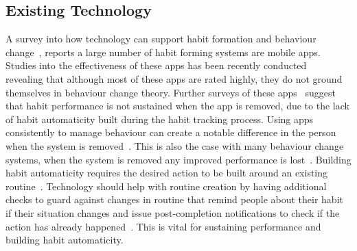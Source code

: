 
\subsection{Existing Technology}
A survey into how technology can support habit formation and behaviour change~\cite{survey_on_current_apps_of_steel}, reports a large number of habit forming systems are mobile apps. Studies into the effectiveness of these apps has been recently conducted~\cite{article_beyond_self_tracking_designing_apps, article_dont_kick_habit} revealing that although most of these apps are rated highly, they do not ground themselves in behaviour change theory. Further surveys of these apps~\cite{survey_on_apps_2} suggest that habit performance is not sustained when the app is removed, due to the lack of habit automaticity built during the habit tracking process. Using apps consistently to manage behaviour can create a notable difference in the person when the system is removed~\cite{article_my_phone_is_part_of_my_soul}.
This is also the case with many behaviour change systems, when the system is removed any improved performance is lost~\cite{article_dont_kick_habit, article_realtime_feedback_improving_medication_taking}. Building habit automaticity requires the desired action to be built around an existing routine~\cite{article_how_habits_formed_modelling_habit_formation, article_implementation_intentions_multicue}. Technology should help with routine creation by having additional checks to guard against changes in routine that remind people about their habit if their situation changes and issue post-completion notifications to check if the action has already happened~\cite{article_dont_forget_your_pill}. This is vital for sustaining performance and building habit automaticity.

